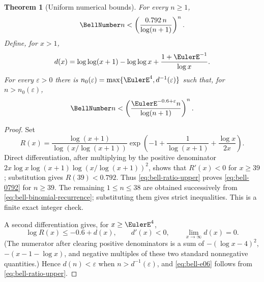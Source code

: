 \documentclass[11pt,a4paper,oneside,openany]{book}
\newtheorem{theorem}{Theorem}[chapter]
\theoremstyle{definition}
\theoremstyle{remark}
\begin{document}
\begin{theorem}[Uniform numerical bounds]\label{thm:bell-numerical-bounds}
For every $n\ge1$,
\begin{equation}\label{eq:bell-0792}
 \BellNumber n<\left(\frac{0.792\,n}{\log(n+1)}\right)^n.
\end{equation}
Define, for $x>1$,
\begin{equation}\label{eq:bell-dx}
 d(x)=\log\log(x+1)-\log\log x+\frac{1+\EulerE^{-1}}{\log x}.
\end{equation}
For every $\varepsilon>0$ there is
$n_0(\varepsilon)=\max\{\EulerE^4,d^{-1}(\varepsilon)\}$ such that, for
$n>n_0(\varepsilon)$,
\begin{equation}\label{eq:bell-e06}
 \BellNumber n<\left(\frac{\EulerE^{-0.6+\varepsilon}n}{\log(n+1)}\right)^n.
\end{equation}
\end{theorem}
\begin{proof}
Set
\[
 R(x)=\frac{\log(x+1)}{\log(x/\log(x+1))}
 \exp\!\left(-1+\frac1{\log(x+1)}+\frac{\log x}{2x}\right).
\]
Direct differentiation, after multiplying by the positive denominator
$2x\log x\log(x+1)\log(x/\log(x+1))^2$, shows that $R'(x)<0$ for $x\ge39$;
substitution gives $R(39)<0.792$.  Thus
\eqref{eq:bell-ratio-upper} proves \eqref{eq:bell-0792} for $n\ge39$.  The
remaining $1\le n\le38$ are obtained successively from
\eqref{eq:bell-binomial-recurrence}; substituting them gives strict inequalities.
This is a finite exact integer check.

A second differentiation gives, for $x\ge \EulerE^4$,
\[
 \log R(x)\le-0.6+d(x),\qquad d'(x)<0,\qquad \lim_{x\to\infty}d(x)=0.
\]
(The numerator after clearing positive denominators is a sum of
$-(\log x-4)^2$, $-(x-1-\log x)$, and negative multiples of these two standard
nonnegative quantities.)  Hence $d(n)<\varepsilon$ when
$n>d^{-1}(\varepsilon)$, and \eqref{eq:bell-e06} follows from
\eqref{eq:bell-ratio-upper}.
\end{proof}
\end{document}
